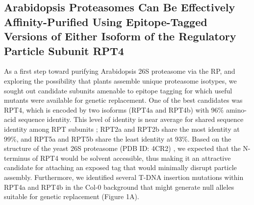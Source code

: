 \subsection{Arabidopsis Proteasomes Can Be Effectively Affinity-Purified Using Epitope-Tagged Versions of Either Isoform of the Regulatory Particle Subunit RPT4}
	As a first step toward purifying Arabidopsis 26S proteasome via the RP, and exploring the possibility that plants assemble unique proteasome isotypes, we sought out candidate subunits amenable to epitope tagging for which useful mutants were available for genetic replacement.  One of the best candidates was RPT4, which is encoded by two isoforms (RPT4a and RPT4b) with 96\% amino-acid sequence identity.  This level of identity is near average for shared sequence identity among RPT subunits \citep{book10}; RPT2a and RPT2b share the most identity at 99\%, and RPT5a and RPT5b share the least identity at 93\%. Based on the structure of the yeast 26S proteasome (PDB ID: 4CR2) \citep{beck12}, we expected that the N-terminus of RPT4 would be solvent accessible, thus making it an attractive candidate for attaching an exposed tag that would minimally disrupt particle assembly.  Furthermore, we identified several T-DNA insertion mutations within RPT4a and RPT4b in the Col-0 background that might generate null alleles suitable for genetic replacement (Figure 1A).   

